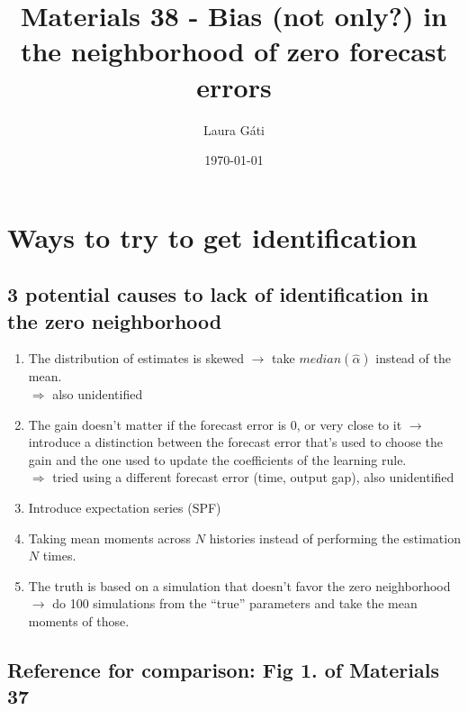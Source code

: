 \documentclass[11pt]{article}
\renewcommand{\[}{\begin{equation}}
\renewcommand{\]}{\end{equation}}
\begin{document}
\linespread{1.0}

\title{Materials 38 - Bias (not only?) in the neighborhood of zero forecast errors}
\author{Laura G\'ati} 
\date{\today}
\maketitle


\tableofcontents


\newpage

\section{Ways to try to get identification}
\subsection*{3 potential causes to lack of identification in the zero neighborhood}
\begin{enumerate}
\item The distribution of estimates is skewed $\rightarrow$ take $median(\hat{\alpha})$ instead of the mean. \\
$\Rightarrow$ also unidentified
\item The gain doesn't matter if the forecast error is 0, or very close to it $\rightarrow$ introduce a distinction between the forecast error that's used to choose the gain and the one used to update the coefficients of the learning rule. \\
$\Rightarrow$ tried using a different forecast error (time, output gap), also unidentified
\item  Introduce expectation series (SPF)
\item Taking mean moments across $N$ histories instead of performing the estimation $N$ times.
\item The truth is based on a simulation that doesn't favor the zero neighborhood $\rightarrow$ do 100 simulations from the ``true'' parameters and take the mean moments of those.
\end{enumerate}

\subsection*{Reference for comparison: Fig 1. of Materials 37}
\end{document}
